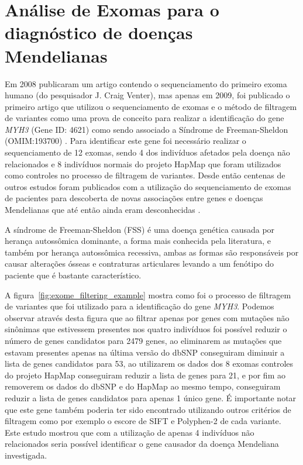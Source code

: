 \section{Análise de Exomas para o diagnóstico de doenças Mendelianas}

Em 2008 \cite{Ng2008} publicaram um artigo contendo o sequenciamento do primeiro exoma humano (do pesquisador J. Craig Venter), mas apenas em 2009, foi publicado o primeiro artigo que utilizou o sequenciamento de exomas e o método de filtragem de variantes como uma prova de conceito para realizar a identificação do gene \textit{MYH3} (Gene ID: 4621) como sendo associado a Síndrome de Freeman-Sheldon (OMIM:193700) \cite{Ng2009}. Para identificar este gene foi necessário realizar o sequenciamento de 12 exomas, sendo 4 dos indivíduos afetados pela doença não relacionados e 8 indivíduos normais do projeto HapMap que foram utilizados como controles no processo de filtragem de variantes. Desde então centenas de outros estudos foram publicados com a utilização do sequenciamento de exomas de pacientes para descoberta de novas associações entre genes e doenças Mendelianas que até então ainda eram desconhecidas \cite{Bamshad2011a}.

A síndrome de Freeman-Sheldon (FSS) é uma doença genética causada por herança autossômica dominante, a forma mais conhecida pela literatura, e também por herança autossômica recessiva, ambas as formas são responsáveis por causar alterações ósseas e contraturas articulares levando a um fenótipo do paciente que é bastante característico.

A figura~\ref{fig:exome_filtering_example} mostra como foi o processo de filtragem de variantes que foi utilizado para a identificação do gene \textit{MYH3}. Podemos observar através desta figura que ao filtrar apenas por genes com mutações não sinônimas que estivessem presentes nos quatro indivíduos foi possível reduzir o número de genes candidatos para 2479 genes, ao eliminarem as mutações que estavam presentes apenas na última versão do dbSNP conseguiram diminuir a lista de genes candidatos para 53, ao utilizarem os dados dos 8 exomas controles do projeto HapMap conseguiram reduzir a lista de genes para 21, e por fim ao removerem os dados do dbSNP e do HapMap ao mesmo tempo, conseguiram reduzir a lista de genes candidatos para apenas 1 único gene. É importante notar que este gene também poderia ter sido encontrado utilizando outros critérios de filtragem como por exemplo o escore de SIFT e Polyphen-2 de cada variante. Este estudo mostrou que com a utilização de apenas 4 indivíduos não relacionados seria possível identificar o gene causador da doença Mendeliana investigada.

